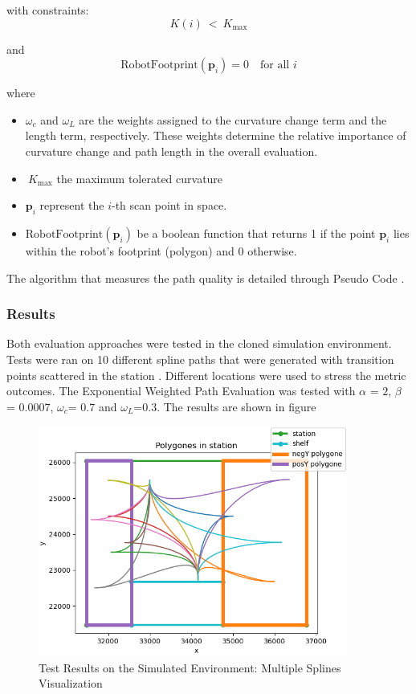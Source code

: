 \noindent
with constraints: \[K(i)\ <\ K_{\max}\]
\noindent

and \[\text{RobotFootprint}(\mathbf{p}_i) = 0 \quad \text{for all } i\]


where \begin{itemize}
    \item \(\omega_c\) and \(\omega_L\) are the weights assigned to the curvature change term and the length term, 
    respectively. These weights determine the relative importance of curvature change and path length in the overall 
    evaluation. 
    \item \(\ K_{\max}\) the maximum tolerated curvature
    \item \( \mathbf{p}_i \) represent the \( i \)-th scan point in space. 

    \item \( \text{RobotFootprint}(\mathbf{p}_i) \) be a boolean function that returns 1 if the point \( \mathbf{p}_i \) 
    lies within the robot's footprint (polygon) and 0 otherwise.
    
\end{itemize}

The algorithm that measures the path quality is detailed through Pseudo Code .

\subsubsection{Results}
Both evaluation approaches were tested in the cloned simulation environment. 
Tests were ran on 10 different spline paths  that were generated with transition points scattered in the station .
Different locations were used to stress the metric outcomes. 
The Exponential Weighted Path Evaluation was tested with \(\alpha\) = \(2\), \(\beta\) = \(0.0007\), 
\(\omega_c\)= \(0.7\) and \(\omega_L\)=\(0.3\).
The results are shown in figure 

\begin{figure}[H]
    \begin{center}
        \includegraphics[width=4in]{images/Chap2/Mult_Splines.png} %
        \caption{Test Results on the Simulated Environment: Multiple Splines Visualization}
        \label{Mult_splines}
        \end{center}    
\end{figure}

